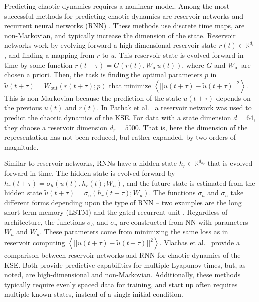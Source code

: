 \documentclass[preprint,aps,pre,letterpaper,onecolumn,superscriptaddress]{revtex4-2} %
\begin{document}
Predicting chaotic dynamics requires a nonlinear model. Among the most successful methods for predicting chaotic dynamics are reservoir networks \cite{Pathak2018a} and recurrent neural networks (RNN) \cite{Vlachas2018,Vlachas2019}. These methods use discrete time maps, are non-Markovian, and typically increase the dimension of the state.
Reservoir networks work by evolving forward a high-dimensional reservoir state $r(t)\in \mathbb{R}^{d_r}$, and finding a mapping from $r$ to $u$. This reservoir state is evolved forward in time by some function $r(t+\tau)=G(r(t),W_\text{in}u(t))$, where $G$ and $W_\text{in}$ are chosen a priori. Then, the task is finding the optimal parameters $p$ in $\tilde{u}(t+\tau)=W_\text{out}(r(t+\tau);p)$ that minimize $\left<||u(t+\tau)-\tilde{u}(t+\tau)||^2\right>$. This is non-Markovian because the prediction of the state $u(t+\tau)$ depends on the previous $u(t)$ and $r(t)$.
 In Pathak et al.\ \cite{Pathak2018a} a reservoir network was used to predict the chaotic dynamics of the KSE. For data with a state dimension $d=64$, they choose a reservoir dimension $d_r=5000$.  That is, here  the dimension of the representation has not been reduced, but rather expanded, by two orders of magnitude.

Similar to reservoir networks, RNNs have a hidden state $h_r\in \mathbb{R}^{d_{h_r}}$ that is evolved forward in time. The hidden state is evolved forward by $h_r(t+\tau)=\sigma_h(u(t),h_r(t);W_h)$, and the future state is estimated from the hidden state $\tilde{u}(t+\tau)=\sigma_u(h_r(t+\tau);W_u)$. The functions $\sigma_h$ and $\sigma_u$ take different forms depending upon the type of RNN -- two examples are the long short-term memory (LSTM) \cite{Hochreiter1997} and the gated recurrent unit \cite{cho-etal-2014-properties}. Regardless of architecture, the functions $\sigma_h$ and $\sigma_u$ are constructed from NN with parameters $W_h$ and $W_u$. 
These parameters come from minimizing the same loss as in reservoir computing $\left<||u(t+\tau)-\tilde{u}(t+\tau)||^2\right>$. 
Vlachas et al.\ \cite{Vlachas2019} provide a comparison between reservoir networks and RNN for chaotic dynamics of the KSE. Both provide predictive capabilities for multiple Lyapunov times, but, as noted, are high-dimensional and non-Markovian. Additionally, these methods typically require evenly spaced data for training, and start up often requires multiple known states, instead of a single initial condition. 
\end{document}
